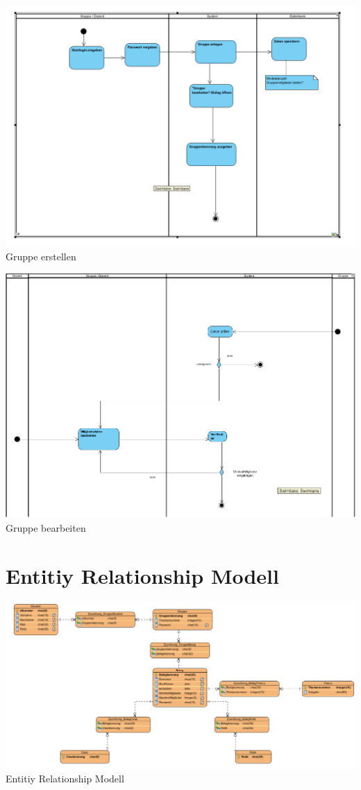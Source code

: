\documentclass{article}
\begin{document}
\includegraphics[scale=0.6]{bilder/Gruppe_erstellen_Activity.png}
Gruppe erstellen

\includegraphics[angle=270,scale=0.9]{bilder/Gruppe_bearbeiten_Activity.png}
Gruppe bearbeiten

\section{Entitiy Relationship Modell}

\includegraphics[angle=270,scale=0.68]{bilder/DatenbankModell.png}
Entitiy Relationship Modell
\end{document}
